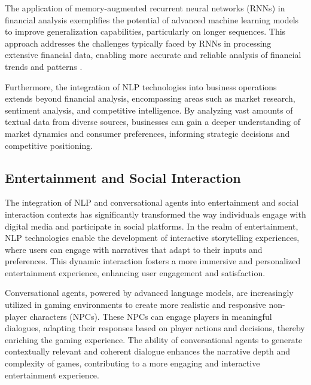 The application of memory-augmented recurrent neural networks (RNNs) in financial analysis exemplifies the potential of advanced machine learning models to improve generalization capabilities, particularly on longer sequences. This approach addresses the challenges typically faced by RNNs in processing extensive financial data, enabling more accurate and reliable analysis of financial trends and patterns \cite{das2024exploringlearnabilitymemoryaugmentedrecurrent}.



Furthermore, the integration of NLP technologies into business operations extends beyond financial analysis, encompassing areas such as market research, sentiment analysis, and competitive intelligence. By analyzing vast amounts of textual data from diverse sources, businesses can gain a deeper understanding of market dynamics and consumer preferences, informing strategic decisions and competitive positioning.





\subsection{Entertainment and Social Interaction} \label{subsec:Entertainment and Social Interaction}

The integration of NLP and conversational agents into entertainment and social interaction contexts has significantly transformed the way individuals engage with digital media and participate in social platforms. In the realm of entertainment, NLP technologies enable the development of interactive storytelling experiences, where users can engage with narratives that adapt to their inputs and preferences. This dynamic interaction fosters a more immersive and personalized entertainment experience, enhancing user engagement and satisfaction.



Conversational agents, powered by advanced language models, are increasingly utilized in gaming environments to create more realistic and responsive non-player characters (NPCs). These NPCs can engage players in meaningful dialogues, adapting their responses based on player actions and decisions, thereby enriching the gaming experience. The ability of conversational agents to generate contextually relevant and coherent dialogue enhances the narrative depth and complexity of games, contributing to a more engaging and interactive entertainment experience.



